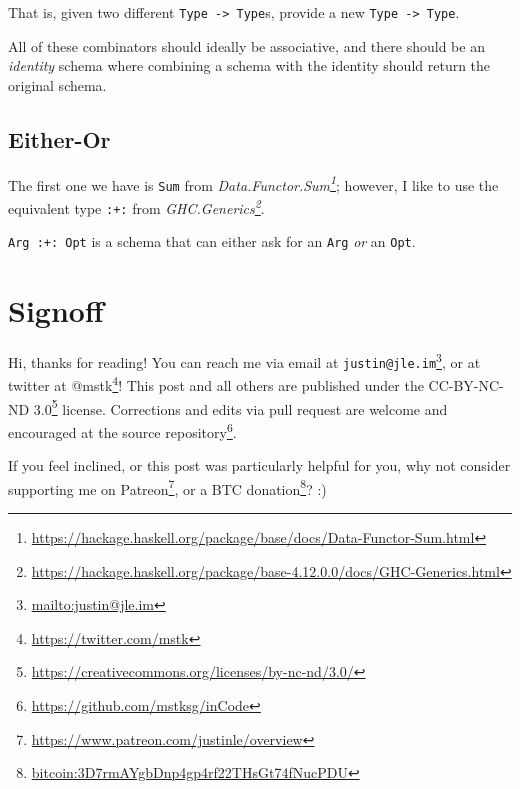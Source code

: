 \documentclass[]{article}
\renewcommand{\href}[2]{#2\footnote{\url{#1}}}
\begin{document}
That is, given two different \texttt{Type\ -\textgreater{}\ Type}s, provide a
new \texttt{Type\ -\textgreater{}\ Type}.

All of these combinators should ideally be associative, and there should be an
\emph{identity} schema where combining a schema with the identity should return
the original schema.

\subsection{Either-Or}\label{either-or}

The first one we have is \texttt{Sum} from
\emph{\href{https://hackage.haskell.org/package/base/docs/Data-Functor-Sum.html}{Data.Functor.Sum}};
however, I like to use the equivalent type \texttt{:+:} from
\emph{\href{https://hackage.haskell.org/package/base-4.12.0.0/docs/GHC-Generics.html}{GHC.Generics}}.

\texttt{Arg\ :+:\ Opt} is a schema that can either ask for an \texttt{Arg}
\emph{or} an \texttt{Opt}.

\section{Signoff}\label{signoff}

Hi, thanks for reading! You can reach me via email at
\href{mailto:justin@jle.im}{\nolinkurl{justin@jle.im}}, or at twitter at
\href{https://twitter.com/mstk}{@mstk}! This post and all others are published
under the \href{https://creativecommons.org/licenses/by-nc-nd/3.0/}{CC-BY-NC-ND
3.0} license. Corrections and edits via pull request are welcome and encouraged
at \href{https://github.com/mstksg/inCode}{the source repository}.

If you feel inclined, or this post was particularly helpful for you, why not
consider \href{https://www.patreon.com/justinle/overview}{supporting me on
Patreon}, or a \href{bitcoin:3D7rmAYgbDnp4gp4rf22THsGt74fNucPDU}{BTC donation}?
:)
\end{document}
